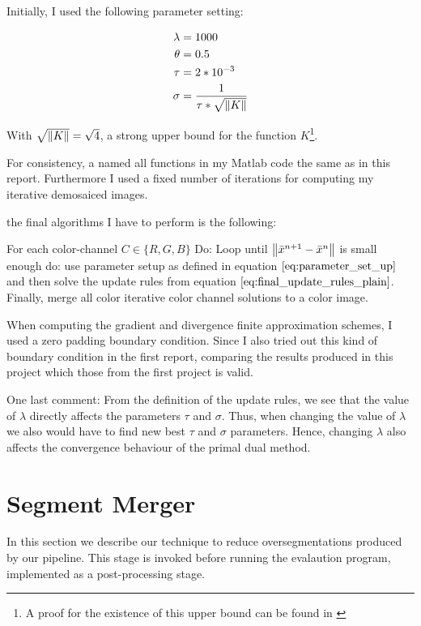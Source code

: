 Initially, I used the following parameter setting:

\begin{align}
	\lambda &= 1000 \\
	\theta &= 0.5 \\
	\tau &= 2*10^{-3} \\
	\sigma &= \frac{1}{\tau * \sqrt{\left\lVert K\right\rVert}}
\label{eq:parameter_set_up}	
\end{align}

With $\sqrt{\left\lVert K\right\rVert} = \sqrt{4}$, a strong upper bound for the function $K$\footnote{A proof for the existence of this upper bound can be found in \cite{chambolle2004algorithm}}.

For consistency, a named all functions in my Matlab code the same as in this report. Furthermore I used a fixed number of iterations for computing my iterative demosaiced images.

the final algorithms I have to perform is the following:

For each color-channel $C \in \{R,G,B\}$ Do: Loop until $\left\lVert\bar{x}^{n+1} - \bar{x}^{n}\right\rVert$ is small enough do: use parameter setup as defined in equation $\ref{eq:parameter_set_up}$ and then solve the update rules from equation $\ref{eq:final_update_rules_plain}$. Finally, merge all color iterative color channel solutions to a color image.

When computing the gradient and divergence finite approximation schemes, I used a zero padding boundary condition. Since I also tried out this kind of boundary condition in the first report, comparing the results produced in this project which those from the first project is valid.

One last comment: From the definition of the update rules, we see that the value of $\lambda$ directly affects the parameters $\tau$ and $\sigma$. Thus, when changing the value of $\lambda$ we also would have to find new best $\tau$ and $\sigma$ parameters. Hence, changing $\lambda$ also affects the convergence behaviour of the primal dual method. 

\section{Segment Merger}
In this section we describe our technique to reduce oversegmentations produced by our pipeline. This stage is invoked before running the evalaution program, implemented as a post-processing stage.

